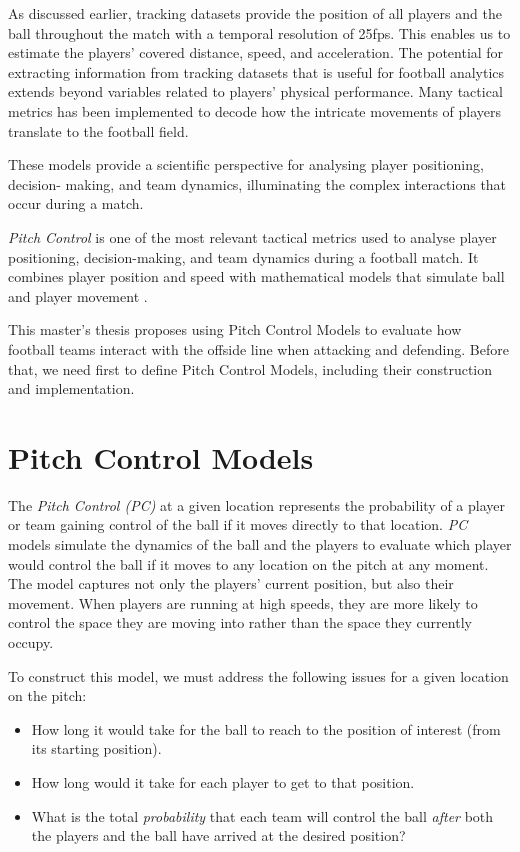 \documentclass[
  10pt,
  twoside,nohyper]{book}
\providecommand{\tightlist}{%
  \setlength{\itemsep}{0pt}\setlength{\parskip}{0pt}}
\begin{document}
As discussed earlier, tracking datasets provide the position of all players and the ball throughout the match with a temporal resolution of 25fps. This enables us to estimate the players' covered distance, speed, and acceleration. The potential for extracting information from tracking datasets that is useful for football analytics extends beyond variables related to players' physical performance. Many tactical metrics has been implemented to decode how the intricate movements of players translate to the football field.

These models provide a scientific perspective for analysing player positioning, decision-
making, and team dynamics, illuminating the complex interactions that occur during a
match.

\emph{Pitch Control} is one of the most relevant tactical metrics used to analyse player positioning, decision-making, and team dynamics during a football match. It combines player position and speed with mathematical models that simulate ball and player movement \citep{Spearman}.

This master's thesis proposes using Pitch Control Models to evaluate how football teams interact with the offside line when attacking and defending. Before that, we need first to define Pitch Control Models, including their construction and implementation.

\section{Pitch Control Models}\label{pitch-control-models}

The \emph{Pitch Control (PC)} at a given location represents the probability of a player or team gaining control of the ball if it moves directly to that location. \emph{PC} models simulate the dynamics of the ball and the players to evaluate which player would control the ball if it moves to any location on the pitch at any moment.
The model captures not only the players' current position, but also their movement. When players are running at high speeds, they are more likely to control
the space they are moving into rather than the space they currently occupy.

To construct this model, we must address the following issues for a given location on the pitch:

\begin{itemize}
\tightlist
\item
  How long it would take for the ball to reach to the position of interest (from its starting position).
\item
  How long would it take for each player to get to that position.
\item
  What is the total \emph{probability} that each team will control the ball \emph{after} both the players and the ball have arrived at the desired position?
\end{itemize}
\end{document}
